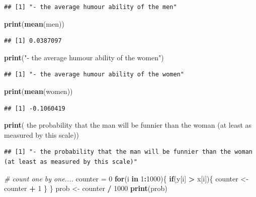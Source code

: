 \documentclass[
  9pt,
]{article}
\newenvironment{Shaded}{\begin{snugshade}}{\end{snugshade}}
\newcommand{\CommentTok}[1]{\textcolor[rgb]{0.56,0.35,0.01}{\textit{#1}}}
\newcommand{\ControlFlowTok}[1]{\textcolor[rgb]{0.13,0.29,0.53}{\textbf{#1}}}
\newcommand{\DecValTok}[1]{\textcolor[rgb]{0.00,0.00,0.81}{#1}}
\newcommand{\KeywordTok}[1]{\textcolor[rgb]{0.13,0.29,0.53}{\textbf{#1}}}
\newcommand{\NormalTok}[1]{#1}
\newcommand{\OperatorTok}[1]{\textcolor[rgb]{0.81,0.36,0.00}{\textbf{#1}}}
\newcommand{\StringTok}[1]{\textcolor[rgb]{0.31,0.60,0.02}{#1}}
\begin{document}
\begin{verbatim}
## [1] "- the average humour ability of the men"
\end{verbatim}

\begin{Shaded}
\begin{Highlighting}[]
\KeywordTok{print}\NormalTok{(}\KeywordTok{mean}\NormalTok{(men))}
\end{Highlighting}
\end{Shaded}

\begin{verbatim}
## [1] 0.0387097
\end{verbatim}

\begin{Shaded}
\begin{Highlighting}[]
\KeywordTok{print}\NormalTok{(}\StringTok{"{-} the average humour ability of the women"}\NormalTok{)}
\end{Highlighting}
\end{Shaded}

\begin{verbatim}
## [1] "- the average humour ability of the women"
\end{verbatim}

\begin{Shaded}
\begin{Highlighting}[]
\KeywordTok{print}\NormalTok{(}\KeywordTok{mean}\NormalTok{(women))}
\end{Highlighting}
\end{Shaded}

\begin{verbatim}
## [1] -0.1060419
\end{verbatim}

\begin{Shaded}
\begin{Highlighting}[]
\KeywordTok{print}\NormalTok{(}\StringTok{\textquotesingle{}{-} the probability that the man will be funnier than the woman (at least as measured by this scale)\textquotesingle{}}\NormalTok{)}
\end{Highlighting}
\end{Shaded}

\begin{verbatim}
## [1] "- the probability that the man will be funnier than the woman (at least as measured by this scale)"
\end{verbatim}

\begin{Shaded}
\begin{Highlighting}[]
\CommentTok{\# count one by one....}
\NormalTok{counter =}\StringTok{ }\DecValTok{0}
\ControlFlowTok{for}\NormalTok{(i }\ControlFlowTok{in} \DecValTok{1}\OperatorTok{:}\DecValTok{1000}\NormalTok{)\{}
  \ControlFlowTok{if}\NormalTok{(y[i] }\OperatorTok{>}\StringTok{ }\NormalTok{x[i])\{}
\NormalTok{  counter <{-}}\StringTok{ }\NormalTok{counter }\OperatorTok{+}\StringTok{ }\DecValTok{1}
\NormalTok{  \}}
\NormalTok{\}}
\NormalTok{prob <{-}}\StringTok{ }\NormalTok{counter }\OperatorTok{/}\StringTok{ }\DecValTok{1000}
\KeywordTok{print}\NormalTok{(prob)}
\end{Highlighting}
\end{Shaded}
\end{document}
